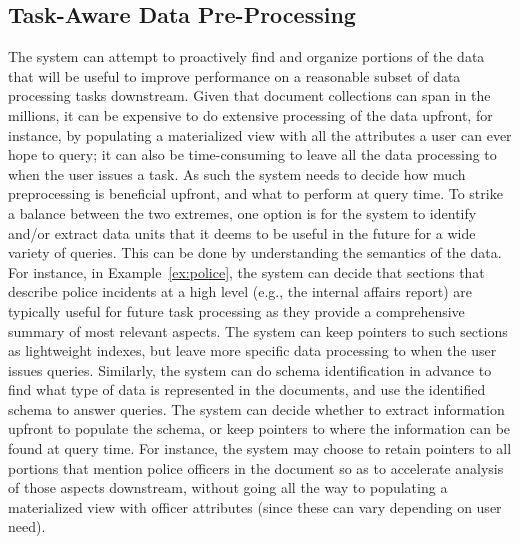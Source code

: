 \subsection{Task-Aware Data Pre-Processing}\label{subsec:taskaware}
The system can attempt to proactively find and organize portions
of the data that will be useful to improve performance on a reasonable subset of data processing tasks downstream. 
Given that document collections 
can span in the millions, 
it can be expensive to do extensive processing of the data upfront, for instance,
by populating a materialized view with all the attributes a user can ever hope to query;
it can also be  time-consuming to leave all the data processing to when the user issues a task. 
As such the system needs to decide how much preprocessing is beneficial upfront, and what to perform at query time. 
To strike a balance between the two extremes, 
one option is for the system to identify and/or extract data units 
that it deems to be useful in the future for a wide variety of queries. 
This can be done by understanding the semantics of the data. 
For instance, in Example~\ref{ex:police}, the system can decide that sections 
that describe police incidents at a high level (e.g., the internal affairs report)
are typically useful for future task processing as they provide a comprehensive summary of most
relevant aspects. 
The system can keep pointers to such sections as lightweight indexes, 
but leave more specific data processing to when the user issues queries. 
Similarly, the system can do schema identification in advance 
to find what type of data is represented in the documents, 
and use the identified schema to answer queries. 
The system can decide whether to extract information 
upfront to populate the schema, 
or keep pointers to where the information 
can be found at query time. 
For instance, the system may choose to retain pointers
to all portions that mention police officers in the document
so as to accelerate analysis of those aspects downstream,
without going all the way to populating a materialized
view with officer attributes (since these can vary 
depending on user need).





